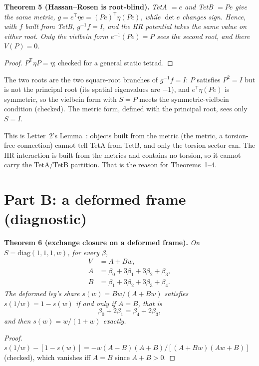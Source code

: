 \documentclass[twocolumn]{iopjournal}
\begin{document}
\textbf{Theorem 5 (Hassan--Rosen is root-blind).} \emph{TetA $= e$
and TetB $= Pe$ give the same metric, $g = e^{\mathsf T}\eta e =
(Pe)^{\mathsf T}\eta(Pe)$, while $\det e$ changes sign. Hence, with $f$
built from TetB, $g^{-1}f = I$, and the HR potential takes the same
value on either root. Only the vielbein form $e^{-1}(Pe) = P$ sees the
second root, and there $V(P) = 0$.}

\begin{proof}
$P^{\mathsf T}\eta P = \eta$; checked for a general static tetrad.
\end{proof}

The two roots are the two square-root branches of $g^{-1}f = I$: $P$
satisfies $P^2 = I$ but is not the principal root (its spatial
eigenvalues are $-1$), and $e^{\mathsf T}\eta(Pe)$ is symmetric, so the
vielbein form with $S = P$ meets the symmetric-vielbein condition
(checked). The metric form, defined with the principal root, sees only
$S = I$.

This is Letter~2's Lemma~\cite{NelsonL2}: objects built from the
metric (the metric, a torsion-free connection) cannot tell TetA from
TetB, and only the torsion sector can. The HR interaction is built from
the metrics and contains no torsion, so it cannot carry the TetA/TetB
partition. That is the reason for Theorems~1--4.

\section*{Part B: a deformed frame (diagnostic)}

\textbf{Theorem 6 (exchange closure on a deformed frame).} \emph{On
$S = \mathrm{diag}(1,1,1,w)$, for every $\beta$,
\[
\begin{aligned}
V &= A + Bw,\\
A &= \beta_0+3\beta_1+3\beta_2+\beta_3,\\
B &= \beta_1+3\beta_2+3\beta_3+\beta_4 .
\end{aligned}
\]
The deformed leg's share $s(w) = Bw/(A + Bw)$ satisfies
$s(1/w) = 1 - s(w)$ if and only if $A = B$, that is
\begin{equation}
\beta_0 + 2\beta_1 = \beta_4 + 2\beta_3 ,
\label{eq:cond}
\end{equation}
and then $s(w) = w/(1+w)$ exactly.}

\begin{proof}
$s(1/w) - [1 - s(w)] = -w(A-B)(A+B)/[(A+Bw)(Aw+B)]$ (checked), which
vanishes iff $A = B$ since $A + B > 0$.
\end{proof}
\end{document}
